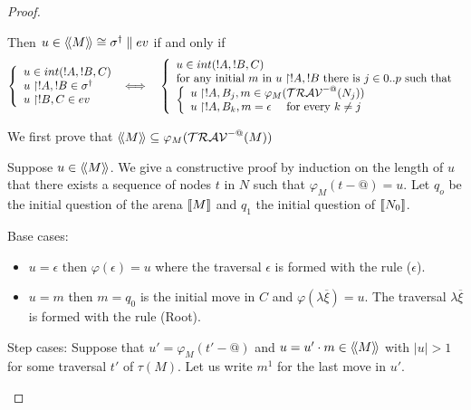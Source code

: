 \begin{proof}
\begin{itemize}
    Then $u \in {\langle\!\langle M \rangle\!\rangle} \cong \sigma^{\dag} \parallel ev$ if and only if
    \begin{eqnarray*}
            \left\{
            \begin{array}{ll}
                u \in int(!A,!B,C)\\
                u \upharpoonright !A,!B  \in \sigma^\dagger \\
                u \upharpoonright !B,C  \in  ev
            \end{array}
            \right.
    & \iff & \left\{
    \begin{array}{ll}
        u \in int(!A,!B,C) \\
        \hbox{for any initial $m$ in $u \upharpoonright !A,!B$ there is $j \in 0..p$ such that } \\
        \left\{\begin{array}{ll}
            u \upharpoonright !A,B_j, m \in \varphi_{M} (\travset^{-@}(N_j)) \label{eq:def_z} \\ %
            u \upharpoonright !A, B_k,m = \epsilon \quad \mbox{ for every } k\neq j \label{eq:b}
        \end{array}
        \right.
    \end{array}
    \right.
    \end{eqnarray*}


    We first prove that ${\langle\!\langle M \rangle\!\rangle} \subseteq \varphi_{M}( \mathcal{TRAV}^{-@}(M) )$


    Suppose $u \in {\langle\!\langle M \rangle\!\rangle}$. We give a constructive proof by induction on the length of $u$ that
    there exists a sequence of nodes $t$ in $N$ such that $\varphi_M(t-@) = u$.
    Let $q_o$ be the initial question of the arena ${[\![ M ]\!]}$ and $q_1$ the initial question of ${[\![ N_0 ]\!]}$.

    Base cases:
    \begin{itemize}
    \item $u=\epsilon$ then $\varphi(\epsilon) = u$ where the traversal $\epsilon$ is formed with the rule ($\epsilon$).
    \item $u=m$ then $m=q_0$ is the initial move in $C$ and $\varphi(\lambda \overline{\xi}) = u$. The traversal
    $\lambda \overline{\xi}$ is formed with the rule (Root).
    \end{itemize}

    Step cases: Suppose that $u' = \varphi_M(t'-@)$ and $u = u' \cdot m \in {\langle\!\langle M \rangle\!\rangle}$ with $|u|>1$ for some traversal $t'$ of $\tau(M)$.
    Let us write $m^1$ for the last move in $u'$.


\end{itemize}
\end{proof}
